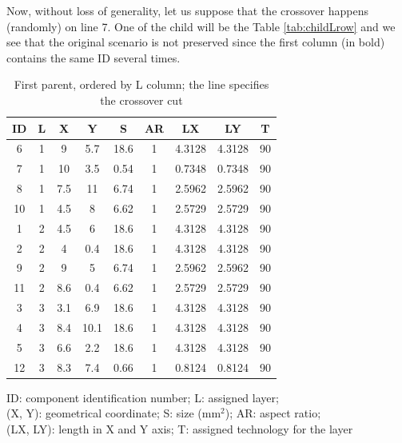 Now, without loss of generality, let us suppose that the crossover happens (randomly) on line 7. One of the child will be the Table \ref{tab:childLrow} and we see that the original scenario is not preserved since the first column (in bold) contains the same ID several times.

\begin{table}[h!]
\caption{First parent, ordered by L column; the line specifies the crossover cut}
\begin{center}
\begin{scriptsize}
\begin{tabular}{|c|c|c|c|c|c|c|c|c|}
\hline ID & L & X & Y & S & AR & LX & LY & T\\
\hline 6 & 1 & 9 & 5.7 & 18.6 & 1 & 4.3128 & 4.3128 & 90\\
7 & 1 & 10 & 3.5 & 0.54 & 1 & 0.7348 & 0.7348 & 90\\
8 & 1 & 7.5 & 11 & 6.74 & 1 & 2.5962 & 2.5962 & 90\\
10 & 1 & 4.5 & 8 & 6.62 & 1 & 2.5729 & 2.5729 & 90\\
1 & 2 & 4.5 & 6 & 18.6 & 1 & 4.3128 & 4.3128 & 90\\
2 & 2 & 4 & 0.4 & 18.6 & 1 & 4.3128 & 4.3128 & 90\\
9 & 2 & 9 & 5 & 6.74 & 1 & 2.5962 & 2.5962 & 90\\
\hline
\hline
11 & 2 & 8.6 & 0.4 & 6.62 & 1 & 2.5729 & 2.5729 & 90\\
3 & 3 & 3.1 & 6.9 & 18.6 & 1 & 4.3128 & 4.3128 & 90\\
4 & 3 & 8.4 & 10.1 & 18.6 & 1 & 4.3128 & 4.3128 & 90\\
5 & 3 & 6.6 & 2.2 & 18.6 & 1 & 4.3128 & 4.3128 & 90\\
12 & 3 & 8.3 & 7.4 & 0.66 & 1 & 0.8124 & 0.8124 & 90\\
\hline
\end{tabular}
\end{scriptsize}
\end{center}
\begin{center}
\begin{scriptsize}
ID: component identification number; L: assigned layer;\\
(X, Y): geometrical coordinate; S: size (mm$^2$); AR: aspect ratio;\\
(LX, LY): length in X and Y axis; T: assigned technology for the layer
\end{scriptsize}
\end{center}
\label{tab:firstparentLrow}
\end{table}

